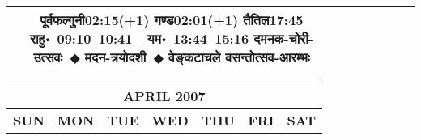 \documentclass[a3paper,12pt,landscape]{article}
\newcommand{\eventsep}{~$\Diamondblack$ }
\newcommand{\To}{\hspace{1pt}\raisebox{0pt}{\tiny\RIGHTarrow}\hspace{1pt}}
\newcommand{\rahuyama}[2]{%
{राहु॰~\textsf{#1}~~यम॰~\textsf{#2}}
}
\begin{document}
\begin{center}
\begin{tabular}{|c|c|c|c|c|c|c|}
{{\mbox{पूर्वफल्गुनी\To{}\textsf{02:15(+1)\hspace{2ex}}}}%
{\mbox{गण्ड\To{}\textsf{02:01(+1)\hspace{2ex}}}}%
{\mbox{तैतिल\To{}\textsf{17:45\hspace{2ex}}}}}%
{\rahuyama{09:10--10:41}{13:44--15:16}}%
{दमनक-चोरी-उत्सवः\eventsep मदन-त्रयोदशी\eventsep वेङ्कटाचले वसन्तोत्सव-आरम्भः}
\\ \hline %
\end{tabular}



\begin{tabular}{|c|c|c|c|c|c|c|}
\multicolumn{7}{c}{\Large \bfseries \sffamily APRIL 2007}\\[3mm]
\hline
\textbf{\textsf{SUN}} & \textbf{\textsf{MON}} & \textbf{\textsf{TUE}} & \textbf{\textsf{WED}} & \textbf{\textsf{THU}} & \textbf{\textsf{FRI}} & \textbf{\textsf{SAT}} \\ \hline


\end{tabular}
\end{center}
\end{document}
